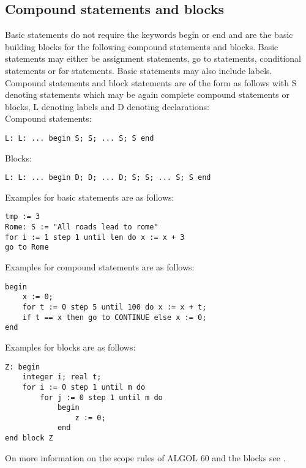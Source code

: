 \documentclass{article}
\begin{document}
\subsection{Compound statements and blocks}
Basic statements do not require the keywords begin or end and are the basic building blocks for the following compound statements and blocks. Basic statements may either be assignment statements, go to statements, conditional statements or for statements. Basic statements may also include labels.\\

Compound statements and block statements are of the form as follows with S denoting statements which may be again complete compound statements or blocks, L denoting labels and D denoting declarations:\\

Compound statements:
\begin{lstlisting}[language={[60]algol}]
L: L: ... begin S; S; ... S; S end
\end{lstlisting}

Blocks:
\begin{lstlisting}[language={[60]algol}]
L: L: ... begin D; D; ... D; S; S; ... S; S end
\end{lstlisting}

Examples for basic statements are as follows:\\ 
\begin{lstlisting}[language={[60]algol}]
tmp := 3
Rome: S := "All roads lead to rome"
for i := 1 step 1 until len do x := x + 3
go to Rome
\end{lstlisting}

Examples for compound statements are as follows:\\
\begin{lstlisting}[language={[60]algol}]
begin
	x := 0;
	for t := 0 step 5 until 100 do x := x + t;
	if t == x then go to CONTINUE else x := 0;
end
\end{lstlisting}

Examples for blocks are as follows:\\ 
\begin{lstlisting}[language={[60]algol}]
Z: begin 
	integer i; real t;
	for i := 0 step 1 until m do
		for j := 0 step 1 until m do
			begin
				z := 0;
			end
end block Z
\end{lstlisting}

On more information on the scope rules of ALGOL 60 and the blocks see .
\end{document}
